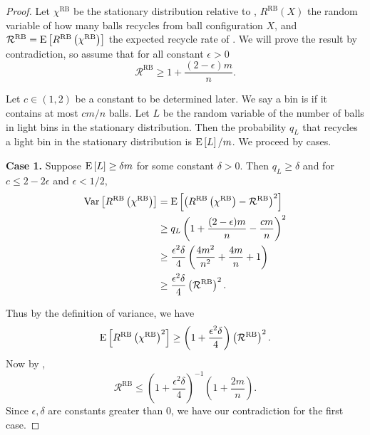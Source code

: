 \begin{proof}
	Let $\chi^\textrm{RB}$ be the stationary distribution relative to \RB,
	$R^\textrm{RB}(X)$ the random variable of how many balls \RB recycles from
	ball configuration $X$, and $\mathcal{R}^\textrm{RB} =
	\mathrm{E}\left[R^\textrm{RB}\left(\chi^\textrm{RB}\right)\right]$ the expected recycle rate
	of \RB.  We will prove the result by contradiction, so assume that for all 
	constant $\epsilon > 0$
	\[\mathcal{R}^\textrm{RB} \geq 1 + \frac{(2-\epsilon)m}{n}.\]

	Let $c\in(1,2)$ be a constant to be determined later. We say a bin is
	 if it contains at most $cm/n$ balls. Let $L$ be the random
	variable of the number of balls in light bins in the stationary
	distribution. Then the probability $q_L$ that \RB recycles a light bin in
	the stationary distribution is $\mathrm{E}\left[L\right]/m$. We proceed by cases.

{\bf Case 1.} Suppose $\mathrm{E}\left[L\right] \geq \delta m$ for some constant $\delta > 0$. Then $q_L \geq \delta$ and for $c \leq 2 - 2\epsilon$ and $\epsilon < 1/2$,
\begin{align*}
	\mathrm{Var}\left[R^\textrm{RB}\left(\chi^\textrm{RB}\right)\right] 
	&= \mathrm{E}\left[\left(R^\textrm{RB}\left(\chi^\textrm{RB}\right) - \mathcal{R}^\textrm{RB}\right)^2\right]  \\
	&\ge q_L \left(1+\frac{(2-\epsilon)m}{n}-\frac{cm}{n}\right)^2 \\
	&\ge \frac{\epsilon^2\delta}{4} \left(\frac{4m^2}{n^2}+\frac{4m}{n}+1\right) \\
	&\ge \frac{\epsilon^2 \delta}{4} \left(\mathcal{R}^\textrm{RB}\right)^2. \label{eqn:varFl}
\end{align*}

Thus by the definition of variance, we have
\begin{equation*}
	\mathrm{E}\left[R^\textrm{RB}\left(\chi^\textrm{RB}\right)^2\right] \ge \left(1+\frac{\epsilon^2\delta}{4}\right)\left(\mathcal{R}^\textrm{RB}\right)^2. \label{eqn:expF2l}
\end{equation*}
	Now by ,
\begin{equation*}
	\mathcal{R}^\textrm{RB} \le \left(1+\frac{\epsilon^2\delta}{4}\right)^{-1}\left(1+\frac{2m}{n}\right).
\end{equation*}
Since $\epsilon, \delta$ are constants greater than $0$, we have our contradiction for
	the first case. 


\end{proof}

